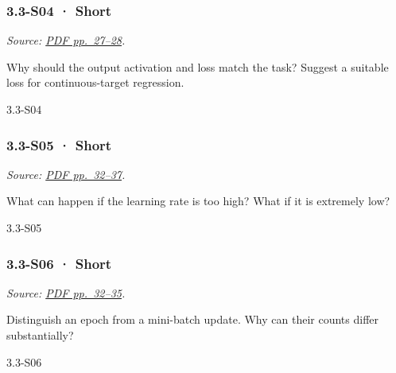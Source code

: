 \noindent\begin{minipage}{\linewidth}

\subsubsection{3.3-S04 · Short}\label{s04-short-9}

\emph{Source:
\href{../Lecture\%20Slides/3.3.\%20Deep\%20Learning\%20Fundamentals.pdf\#page=27}{PDF
pp.~27--28}.}

Why should the output activation and loss match the task? Suggest a
suitable loss for continuous-target regression.

\begin{solution}[20mm]{3.3-S04}

\end{solution}
\end{minipage}\par\medskip

\noindent\begin{minipage}{\linewidth}

\subsubsection{3.3-S05 · Short}\label{s05-short-9}

\emph{Source:
\href{../Lecture\%20Slides/3.3.\%20Deep\%20Learning\%20Fundamentals.pdf\#page=32}{PDF
pp.~32--37}.}

What can happen if the learning rate is too high? What if it is
extremely low?

\begin{solution}[20mm]{3.3-S05}

\end{solution}
\end{minipage}\par\medskip

\noindent\begin{minipage}{\linewidth}

\subsubsection{3.3-S06 · Short}\label{s06-short-9}

\emph{Source:
\href{../Lecture\%20Slides/3.3.\%20Deep\%20Learning\%20Fundamentals.pdf\#page=32}{PDF
pp.~32--35}.}

Distinguish an epoch from a mini-batch update. Why can their counts
differ substantially?

\begin{solution}[20mm]{3.3-S06}

\end{solution}
\end{minipage}\par\medskip

